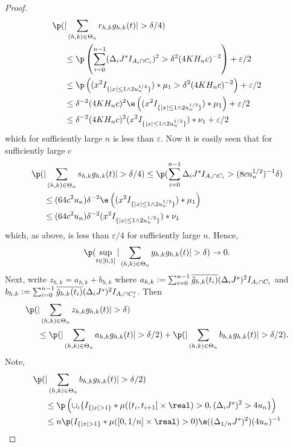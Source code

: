 \begin{proof}
\begin{align}
\p(&\vert\sumt r_{h,k} \ghk(t) \vert > \delta/4) \notag \\&\le \p\left(\sumin ( \djt I_{A_i \cap C_i})^2 > \delta^2 (4K H_nc)^{-2}\right) + \varepsilon/2\notag\\&\le  \p\left( (x^2I_{\{\vert x\vert \le 1 \wedge 2 u_n^{1/2}\}})\ast\mu_1 > \delta^2 (4K H_nc)^{-2}\right) + \varepsilon/2\notag\\
&\le \delta^{-2} (4K H_nc)^{2}\e\left( (x^2I_{\{\vert x\vert \le 1 \wedge 2 u_n^{1/2}\}})\ast\mu_1  \right) + \varepsilon/2\notag\\
&\le \delta^{-2} (4K H_nc)^{2} (x^2I_{\{\vert x\vert \le 1 \wedge 2 u_n^{1/2}\}})\ast\nu_1   + \varepsilon/2\notag
  \label{}
\end{align}
which for sufficiently large $n$ is  less than $\varepsilon$.
Now it is easily seen that for sufficiently large $c$
\begin{align}
  \p(&\vert \sumt s_{h,k} \ghk(t) \vert > \delta/4) \le \p( \sumin  \djt I_{A_i \cap C_i} > (8 c u_n^{1/2})^{-1}\delta) \notag\\
  &\le (64 c^2 u_n)\delta^{-2} \e\left( (x^2I_{\{\vert x\vert \le 1 \wedge 2 u_n^{1/2}\}})\ast\mu_1  \right)\notag \\
  & \le  (64 c^2 u_n)\delta^{-2} (x^2I_{\{\vert x\vert \le 1 \wedge 2 u_n^{1/2}\}})\ast\nu_1
  \label{}
\end{align}
which, as above, is  less than $\varepsilon/4$ for sufficiently large $n$.
Hence, 
\begin{align}
  \notag
  \p(\sup_{t \in [0,1]}\vert \sumt y_{h,k} \ghk(t) \vert > \delta) \to 0.\label{eq:y}
\end{align}
Next,  write $z_{h,k} = a_{h,k} + b_{h,k}$ where $a_{h,k} :=  \sum_{i = 0}^{n-1} \overline{\tilde{g}_{h,k}(t_i)}(\Delta_i J^s)^2I_{A_i \cap C_i}$ and  $b_{h,k} := \sum_{i = 0}^{n-1} \overline{\tilde{g}_{h,k}(t_i)}(\Delta_i J^s)^2I_{A_i \cap C_i^c}$. Then 
\begin{align}
  \p(&\vert \sumt z_{h,k} \ghk(t) \vert   > \delta) \notag \\ &\le \p(\vert \sumt a_{h,k} \ghk(t) \vert > \delta/2) + \p(\vert \sumt b_{h,k} \ghk(t) \vert > \delta/2)\notag.
\end{align}
Note,
\begin{align}
  \p(&\vert \sumt b_{h,k} \ghk(t) \vert > \delta/2) \notag \\ &\le
\p\left(\cup_i\{I_{\{\vert x \vert > 1\}}\ast \mu( (t_i, t_{i + 1}] \times \real) > 0   , (\djt)^2 > 4u_n\}\right) \notag \\
&\le n \p(I_{\{\vert x \vert > 1\}}\ast \mu( [0, 1/n] \times \real) > 0) \e((\Delta_{1/n} J^s)^2)(4u_n)^{-1}\notag \\

\end{align}
\end{proof}
